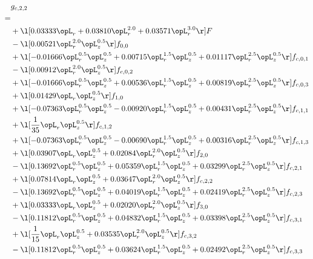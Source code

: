 \begin{alignat}{2} 
\label{eq:g_22_0} 
& g_{c,2,2} \nonumber \\ 
 = \\ 
& + \l[  0.03333 \opL_r +  0.03810 \opL_r^{2.0} +  0.03571 \opL_r^{3.0}  \r] F \nonumber \\ 
& - \l[  0.00521 \opL_r^{2.0} \opL_z^{0.5}  \r] f_{0,0} \nonumber \\ 
& + \l[  -0.01666 \opL_r^{0.5} \opL_z^{0.5} +  0.00715 \opL_r^{1.5} \opL_z^{0.5} +  0.01117 \opL_r^{2.5} \opL_z^{0.5}  \r] f_{c,0,1} \nonumber \\ 
& - \l[  0.00912 \opL_r^{2.0} \opL_z^{0.5}  \r] f_{c,0,2} \nonumber \\ 
& + \l[  -0.01666 \opL_r^{0.5} \opL_z^{0.5} +  0.00536 \opL_r^{1.5} \opL_z^{0.5} +  0.00819 \opL_r^{2.5} \opL_z^{0.5}  \r] f_{c,0,3} \nonumber \\ 
& + \l[  0.01429 \opL_r \opL_z^{0.5}  \r] f_{1,0} \nonumber \\ 
& + \l[  -0.07363 \opL_r^{0.5} \opL_z^{0.5}   -0.00920 \opL_r^{1.5} \opL_z^{0.5} +  0.00431 \opL_r^{2.5} \opL_z^{0.5}  \r] f_{c,1,1} \nonumber \\ 
& + \l[ \frac{1}{35} \opL_r \opL_z^{0.5}  \r] f_{c,1,2} \nonumber \\ 
& + \l[  -0.07363 \opL_r^{0.5} \opL_z^{0.5}   -0.00690 \opL_r^{1.5} \opL_z^{0.5} +  0.00316 \opL_r^{2.5} \opL_z^{0.5}  \r] f_{c,1,3} \nonumber \\ 
& + \l[  0.03907 \opL_r \opL_z^{0.5} +  0.02084 \opL_r^{2.0} \opL_z^{0.5}  \r] f_{2,0} \nonumber \\ 
& - \l[  0.13692 \opL_r^{0.5} \opL_z^{0.5} +  0.05359 \opL_r^{1.5} \opL_z^{0.5} +  0.03299 \opL_r^{2.5} \opL_z^{0.5}  \r] f_{c,2,1} \nonumber \\ 
& + \l[  0.07814 \opL_r \opL_z^{0.5} +  0.03647 \opL_r^{2.0} \opL_z^{0.5}  \r] f_{c,2,2} \nonumber \\ 
& - \l[  0.13692 \opL_r^{0.5} \opL_z^{0.5} +  0.04019 \opL_r^{1.5} \opL_z^{0.5} +  0.02419 \opL_r^{2.5} \opL_z^{0.5}  \r] f_{c,2,3} \nonumber \\ 
& + \l[  0.03333 \opL_r \opL_z^{0.5} +  0.02020 \opL_r^{2.0} \opL_z^{0.5}  \r] f_{3,0} \nonumber \\ 
& - \l[  0.11812 \opL_r^{0.5} \opL_z^{0.5} +  0.04832 \opL_r^{1.5} \opL_z^{0.5} +  0.03398 \opL_r^{2.5} \opL_z^{0.5}  \r] f_{c,3,1} \nonumber \\ 
& + \l[ \frac{1}{15} \opL_r \opL_z^{0.5} +  0.03535 \opL_r^{2.0} \opL_z^{0.5}  \r] f_{c,3,2} \nonumber \\ 
& - \l[  0.11812 \opL_r^{0.5} \opL_z^{0.5} +  0.03624 \opL_r^{1.5} \opL_z^{0.5} +  0.02492 \opL_r^{2.5} \opL_z^{0.5}  \r] f_{c,3,3} \nonumber \\ 
\end{alignat} 


